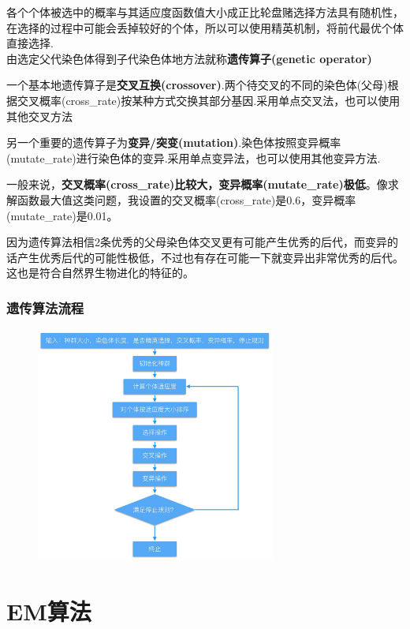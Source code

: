 \documentclass[11pt,a4paper,oneside]{book}
\begin{document}
各个个体被选中的概率与其适应度函数值大小成正比轮盘赌选择方法具有随机性，在选择的过程中可能会丢掉较好的个体，所以可以使用精英机制，将前代最优个体直接选择.\\

由选定父代染色体得到子代染色体地方法就称\textbf{遗传算子(genetic operator)}

一个基本地遗传算子是\textbf{交叉互换(crossover)}.两个待交叉的不同的染色体(父母)根据交叉概率(cross\_rate)按某种方式交换其部分基因.采用单点交叉法，也可以使用其他交叉方法

另一个重要的遗传算子为\textbf{变异/突变(mutation)}.染色体按照变异概率(mutate\_rate)进行染色体的变异.采用单点变异法，也可以使用其他变异方法.

一般来说，\textbf{交叉概率(cross\_rate)比较大，变异概率(mutate\_rate)极低}。像求解函数最大值这类问题，我设置的交叉概率(cross\_rate)是0.6，变异概率(mutate\_rate)是0.01。

因为遗传算法相信2条优秀的父母染色体交叉更有可能产生优秀的后代，而变异的话产生优秀后代的可能性极低，不过也有存在可能一下就变异出非常优秀的后代。这也是符合自然界生物进化的特征的。

\subsection{遗传算法流程}
\begin{figure}[H]
	\centering
	\includegraphics[width=0.7\textwidth]{15.jpg}
\end{figure}

\chapter{EM算法}
\end{document}
